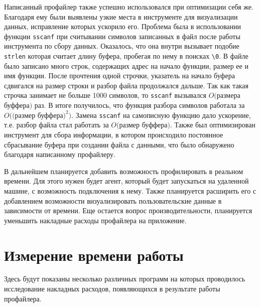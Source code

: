    Написанный профайлер также успешно использовался при оптимизации себя же. Благодаря ему были выявлены узкие места в инструменте для визуализации данных, исправление которых ускорило его. Проблема была в использовании функции \verb|sscanf| при считывании символов записанных в файл после работы инструмента по сбору данных. Оказалось, что она внутри вызывает подобие \verb|strlen| которая считает длину буфера, пробегая по нему в поисках \verb|\0|. В файле было записано много строк, содержащих адрес на начало функции, размер ее и имя функции. После прочтения одной строчки, указатель на начало буфера сдвигался на размер строки и разбор файла продолжался дальше. Так как такая строчка занимает не больше 1000 символов, то \verb|sscanf| вызывался $O($размера буффера$)$ раз. В итоге получилось, что функция разбора символов работала за $O(($размер буффера$) ^ 2)$. Замена \verb|sscanf| на самописную функцию дало ускорение, т.е. разбор файла стал работать за $O($размер буффера$)$. Также был оптимизирован инструмент для сбора информации, в котором происходило постоянное сбрасывание буфера при создании файла с данными, что было обнаружено благодаря написанному профайлеру. %
    
    В дальнейшем планируется добавить возможность профилировать в реальном времени. Для этого нужен будет агент, который будет запускаться на удаленной машине, с возможность подключения к нему. Также планируется расширить его с добавлением возможности визуализировать пользовательские данные в зависимости от времени. Еще остается вопрос производительности, планируется уменьшить накладные расходы профайлера на приложение.
	

\printmainbibliography

\appendix

\chapter{Измерение времени работы}

Здесь будут показаны несколько различных программ на которых проводилось исследование накладных расходов,  появляющихся в результате работы профайлера.



